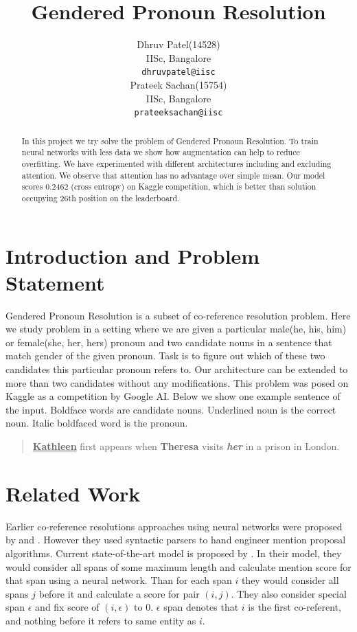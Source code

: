 \documentclass[11pt,a4paper]{article}
\title{Gendered Pronoun Resolution}
\author{Dhruv Patel(14528) \\
  IISc, Bangalore \\
  \texttt{dhruvpatel@iisc} \\\And
  Prateek Sachan(15754) \\
  IISc, Bangalore \\
  \texttt{prateeksachan@iisc} \\
  }
\date{}
\begin{document}
\maketitle
\begin{abstract}
  In this project we try solve the problem of Gendered Pronoun Resolution. To train neural networks with less data we show how augmentation can help to reduce overfitting. We have experimented with different architectures including and excluding attention. We observe that attention has no advantage over simple mean. Our model scores 0.2462 (cross entropy) on Kaggle competition, which is better than solution occupying 26th position on the leaderboard.
\end{abstract}

\section{Introduction and Problem Statement}
Gendered Pronoun Resolution is a subset of co-reference resolution problem. Here we study problem in a setting where we are given a particular male(he, his, him) or female(she, her, hers) pronoun and two candidate nouns in a sentence that match gender of the given pronoun. Task is to figure out which of these two candidates this particular pronoun refers to.  Our architecture can be extended to more than two candidates without any modifications. This problem was posed on Kaggle as a competition by Google AI. Below we show one example sentence of the input. Boldface words are candidate nouns. Underlined noun is the correct noun. Italic boldfaced word is the pronoun.
\begin{quote}
   \textbf{\underline{Kathleen}} first appears when \textbf{Theresa} visits \textbf{\textit{her}} in a prison in London.
\end{quote}

\section{Related Work}
Earlier co-reference resolutions approaches using neural networks were proposed by \citet{wiseman2016learning} and \citet{clarkmanning2016deep}. However they used syntactic parsers to hand engineer mention proposal algorithms. Current state-of-the-art model is proposed by \citet{lee2017end}. In their model, they would consider all spans of some maximum length and calculate mention score for that span using a neural network. Than for each span $i$ they would consider all spans $j$ before it and calculate a score for pair $(i, j)$. They also consider special span $\epsilon$ and fix score of $(i, \epsilon)$ to 0. $\epsilon$ span denotes that $i$ is the first co-referent, and nothing before it refers to same entity as $i$.
\end{document}
